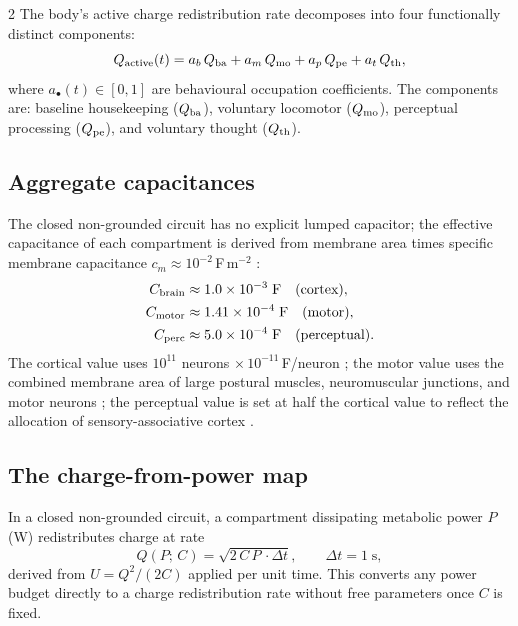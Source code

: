 \begin{multicols}{2}
The body's active charge redistribution rate decomposes into four
functionally distinct components:
\begin{equation}
  Q_{\mathrm{active}}(t)
  = a_b\,Q_{\mathrm{ba}} + a_m\,Q_{\mathrm{mo}} + a_p\,Q_{\mathrm{pe}} + a_t\,Q_{\mathrm{th}},
  \label{eq:ch07-decomp}
\end{equation}
where $a_\bullet(t) \in [0,1]$ are behavioural occupation coefficients.
The components are: baseline housekeeping ($Q_{\mathrm{ba}}$), voluntary locomotor
($Q_{\mathrm{mo}}$), perceptual processing ($Q_{\mathrm{pe}}$), and voluntary thought ($Q_{\mathrm{th}}$).

\subsection{Aggregate capacitances}

The closed non-grounded circuit has no explicit lumped capacitor; the
effective capacitance of each compartment is derived from membrane area times
specific membrane capacitance $c_m \approx 10^{-2}$\,F\,m$^{-2}$
\citep{gentet2000,cole1941}:
\begin{align}
  C_{\mathrm{brain}} &\approx 1.0\times10^{-3}\;\mathrm{F} \quad\text{(cortex)},
    \label{eq:ch07-Cbrain}\\
  C_{\mathrm{motor}} &\approx 1.41\times10^{-4}\;\mathrm{F} \quad\text{(motor)},
    \label{eq:ch07-Cmotor}\\
  C_{\mathrm{perc}}  &\approx 5.0\times10^{-4}\;\mathrm{F} \quad\text{(perceptual)}.
    \label{eq:ch07-Cperc}
\end{align}
The cortical value uses $10^{11}$ neurons $\times\,10^{-11}$\,F/neuron
\citep{kandel2013,attwell2001}; the motor value uses the combined membrane
area of large postural muscles, neuromuscular junctions, and motor neurons
\citep{purves2018}; the perceptual value is set at half the cortical value
to reflect the allocation of sensory-associative cortex \citep{zeki1993,
koch2004}.

\subsection{The charge-from-power map}

In a closed non-grounded circuit, a compartment dissipating metabolic power
$P$ (W) redistributes charge at rate
\begin{equation}
  Q(P;\,C) = \sqrt{2\,C\,P\,\cdot\Delta t},
  \qquad \Delta t = 1\;\text{s},
  \label{eq:ch07-QfromP}
\end{equation}
derived from $U = Q^2/(2C)$ applied per unit time.  This converts any
power budget directly to a charge redistribution rate without free
parameters once $C$ is fixed.


\end{multicols}
